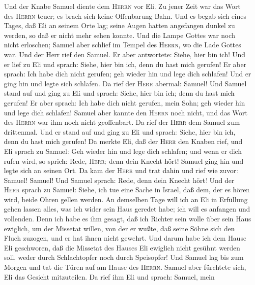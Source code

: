  Und der Knabe Samuel diente dem \textsc{Herrn} vor Eli.
Zu jener Zeit war das Wort des \textsc{Herrn} teuer; es brach sich keine
Offenbarung Bahn.  Und es begab sich eines Tages, daß Eli
an seinem Orte lag; seine Augen hatten angefangen dunkel zu werden, so
daß er nicht mehr sehen konnte.  Und die Lampe Gottes war
noch nicht erloschen; Samuel aber schlief im Tempel des \textsc{Herrn},
wo die Lade Gottes war.  Und der Herr rief den Samuel. Er
aber antwortete: Siehe, hier bin ich!  Und er lief zu Eli
und sprach: Siehe, hier bin ich, denn du hast mich gerufen! Er aber
sprach: Ich habe dich nicht gerufen; geh wieder hin und lege dich
schlafen! Und er ging hin und legte sich schlafen.  Da
rief der \textsc{Herr} abermal: Samuel! Und Samuel stand auf und ging zu
Eli und sprach: Siehe, hier bin ich; denn du hast mich gerufen! Er aber
sprach: Ich habe dich nicht gerufen, mein Sohn; geh wieder hin und lege
dich schlafen!  Samuel aber kannte den \textsc{Herrn} noch
nicht, und das Wort des \textsc{Herrn} war ihm noch nicht geoffenbart.
 Da rief der \textsc{Herr} dem Samuel zum drittenmal. Und
er stand auf und ging zu Eli und sprach: Siehe, hier bin ich, denn du
hast mich gerufen! Da merkte Eli, daß der \textsc{Herr} den Knaben rief,
 und Eli sprach zu Samuel: Geh wieder hin und lege dich
schlafen; und wenn er dich rufen wird, so sprich: Rede, \textsc{Herr};
denn dein Knecht hört! Samuel ging hin und legte sich an seinen Ort.
 Da kam der \textsc{Herr} und trat dahin und rief wie
zuvor: Samuel! Samuel! Und Samuel sprach: Rede, denn dein Knecht hört!
 Und der \textsc{Herr} sprach zu Samuel: Siehe, ich tue
eine Sache in Israel, daß dem, der es hören wird, beide Ohren gellen
werden.  An demselben Tage will ich an Eli in Erfüllung
gehen lassen alles, was ich wider sein Haus geredet habe; ich will es
anfangen und vollenden.  Denn ich habe es ihm gesagt, daß
ich Richter sein wolle über sein Haus ewiglich, um der Missetat willen,
von der er wußte, daß seine Söhne sich den Fluch zuzogen, und er hat
ihnen nicht gewehrt.  Und darum habe ich dem Hause Eli
geschworen, daß die Missetat des Hauses Eli ewiglich nicht gesühnt
werden soll, weder durch Schlachtopfer noch durch Speisopfer!
 Und Samuel lag bis zum Morgen und tat die Türen auf am
Hause des \textsc{Herrn}. Samuel aber fürchtete sich, Eli das Gesicht
mitzuteilen.  Da rief ihm Eli und sprach: Samuel, mein
